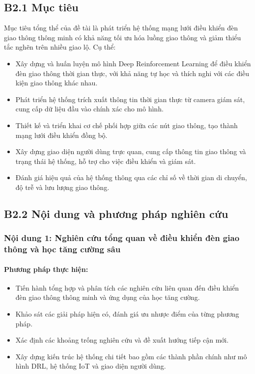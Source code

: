\documentclass[letterpaper]{article}
\begin{document}
\subsection{B2.1 Mục tiêu}

Mục tiêu tổng thể của đề tài là phát triển hệ thống mạng lưới điều khiển đèn giao thông thông minh có khả năng tối ưu hóa luồng giao thông và giảm thiểu tắc nghẽn trên nhiều giao lộ. Cụ thể:

\begin{itemize}
    \item Xây dựng và huấn luyện mô hình Deep Reinforcement Learning để điều khiển đèn giao thông thời gian thực, với khả năng tự học và thích nghi với các điều kiện giao thông khác nhau.
    \item Phát triển hệ thống trích xuất thông tin thời gian thực từ camera giám sát, cung cấp dữ liệu đầu vào chính xác cho mô hình.
    \item Thiết kế và triển khai cơ chế phối hợp giữa các nút giao thông, tạo thành mạng lưới điều khiển đồng bộ.
    \item Xây dựng giao diện người dùng trực quan, cung cấp thông tin giao thông và trạng thái hệ thống, hỗ trợ cho việc điều khiển và giám sát.
    \item Đánh giá hiệu quả của hệ thống thông qua các chỉ số về thời gian di chuyển, độ trễ và lưu lượng giao thông.
\end{itemize}

\subsection{B2.2 Nội dung và phương pháp nghiên cứu}

\subsubsection{Nội dung 1: Nghiên cứu tổng quan về điều khiển đèn giao thông và học tăng cường sâu}

\paragraph{Phương pháp thực hiện:}
\begin{itemize}
    \item Tiến hành tổng hợp và phân tích các nghiên cứu liên quan đến điều khiển đèn giao thông thông minh và ứng dụng của học tăng cường.
    \item Khảo sát các giải pháp hiện có, đánh giá ưu nhược điểm của từng phương pháp.
    \item Xác định các khoảng trống nghiên cứu và đề xuất hướng tiếp cận mới.
    \item Xây dựng kiến trúc hệ thống chi tiết bao gồm các thành phần chính như mô hình DRL, hệ thống IoT và giao diện người dùng.
\end{itemize}
\end{document}
